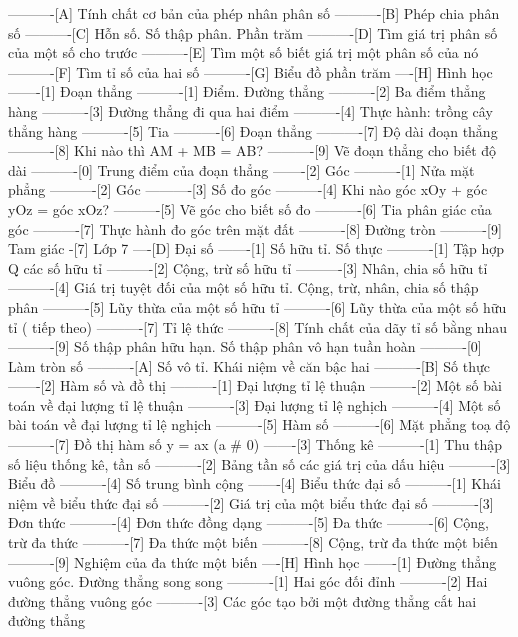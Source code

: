----------[A] Tính chất cơ bản của phép nhân phân số
----------[B] Phép chia phân số
----------[C] Hỗn số. Số thập phân. Phần trăm
----------[D] Tìm giá trị phân số của một số cho trước
----------[E] Tìm một số biết giá trị một phân số của nó
----------[F] Tìm tỉ số của hai số
----------[G] Biểu đồ phần trăm
----[H] Hình học
-------[1] Đoạn thẳng
----------[1] Điểm. Đường thẳng
----------[2] Ba điểm thẳng hàng
----------[3] Đường thẳng đi qua hai điểm
----------[4] Thực hành: trồng cây thẳng hàng
----------[5] Tia
----------[6] Đoạn thẳng
----------[7] Độ dài đoạn thẳng
----------[8] Khi nào thì AM + MB = AB?
----------[9] Vẽ đoạn thẳng cho biết độ dài
----------[0] Trung điểm của đoạn thẳng
-------[2] Góc
----------[1] Nửa mặt phẳng
----------[2] Góc
----------[3] Số đo góc
----------[4] Khi nào góc xOy + góc yOz = góc xOz?
----------[5] Vẽ góc cho biết số đo
----------[6] Tia phân giác của góc
----------[7] Thực hành đo góc trên mặt đất
----------[8] Đường tròn
----------[9] Tam giác
-[7] Lớp 7
----[D] Đại số
-------[1] Số hữu tỉ. Số thực
----------[1] Tập hợp Q các số hữu tỉ
----------[2] Cộng, trừ số hữu tỉ
----------[3] Nhân, chia số hữu tỉ
----------[4] Giá trị tuyệt đối của một số hữu tỉ. Cộng, trừ, nhân, chia số thập phân
----------[5] Lũy thừa của một số hữu tỉ
----------[6] Lũy thừa của một số hữu tỉ ( tiếp theo)
----------[7] Tỉ lệ thức
----------[8] Tính chất của dãy tỉ số bằng nhau
----------[9] Số thập phân hữu hạn. Số thập phân vô hạn tuần hoàn
----------[0] Làm tròn số
----------[A] Số vô tỉ. Khái niệm về căn bậc hai
----------[B] Số thực
-------[2] Hàm số và đồ thị
----------[1] Đại lượng tỉ lệ thuận
----------[2] Một số bài toán về đại lượng tỉ lệ thuận
----------[3] Đại lượng tỉ lệ nghịch
----------[4] Một số bài toán về đại lượng tỉ lệ nghịch
----------[5] Hàm số
----------[6] Mặt phẳng toạ độ
----------[7] Đồ thị hàm số y = ax (a # 0)
-------[3] Thống kê
----------[1] Thu thập số liệu thống kê, tần số
----------[2] Bảng tần số các giá trị của dấu hiệu
----------[3] Biểu đồ
----------[4] Số trung bình cộng
-------[4] Biểu thức đại số
----------[1] Khái niệm về biểu thức đại số
----------[2] Giá trị của một biểu thức đại số
----------[3] Đơn thức
----------[4] Đơn thức đồng dạng
----------[5] Đa thức
----------[6] Cộng, trừ đa thức
----------[7] Đa thức một biến
----------[8] Cộng, trừ đa thức một biến
----------[9] Nghiệm của đa thức một biến
----[H] Hình học
-------[1] Đường thẳng vuông góc. Đường thẳng song song
----------[1] Hai góc đối đỉnh
----------[2] Hai đường thẳng vuông góc
----------[3] Các góc tạo bởi một đường thẳng cắt hai đường thẳng
